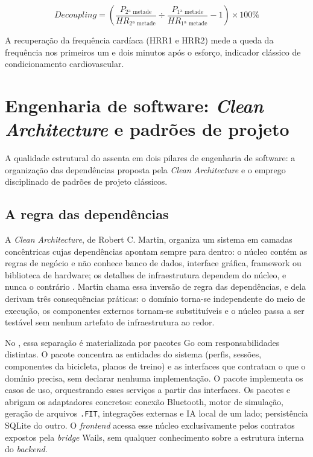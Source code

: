 \begin{equation}\label{eq:decoupling}
Decoupling = \left( \frac{P_{\text{2ª metade}}}{HR_{\text{2ª metade}}} \div \frac{P_{\text{1ª metade}}}{HR_{\text{1ª metade}}} - 1 \right) \times 100\%
\end{equation}

A recuperação da frequência cardíaca (HRR1 e HRR2) mede a queda da frequência
nos primeiros um e dois minutos após o esforço, indicador clássico de
condicionamento cardiovascular.

\section{Engenharia de software: \textit{Clean Architecture} e padrões de projeto}
\label{sec:engenharia}

A qualidade estrutural do \argus{} assenta em dois pilares de engenharia de
software: a organização das dependências proposta pela \textit{Clean
Architecture} e o emprego disciplinado de padrões de projeto clássicos.

\subsection{A regra das dependências}
\label{sec:clean-architecture}

A \textit{Clean Architecture}, de Robert C. Martin, organiza um sistema em
camadas concêntricas cujas dependências apontam sempre para dentro: o núcleo
contém as regras de negócio e não conhece banco de dados, interface gráfica,
framework ou biblioteca de hardware; os detalhes de infraestrutura dependem do
núcleo, e nunca o contrário \cite{martin2017clean}. Martin chama essa inversão
de regra das dependências, e dela derivam três consequências práticas: o
domínio torna-se independente do meio de execução, os componentes externos
tornam-se substituíveis e o núcleo passa a ser testável sem nenhum artefato
de infraestrutura ao redor.

No \argus{}, essa separação é materializada por pacotes Go com
responsabilidades distintas. O pacote  concentra as
entidades do sistema (perfis, sessões, componentes da bicicleta, planos de
treino) e as interfaces que contratam o que o domínio precisa, sem declarar
nenhuma implementação. O pacote  implementa os casos de
uso, orquestrando esses serviços a partir das interfaces. Os pacotes
 e  abrigam os adaptadores
concretos: conexão Bluetooth, motor de simulação, geração de arquivos
\texttt{.FIT}, integrações externas e IA local de um lado; persistência SQLite
do outro. O \textit{frontend} acessa esse núcleo exclusivamente pelos
contratos expostos pela \textit{bridge} Wails, sem qualquer conhecimento
sobre a estrutura interna do \textit{backend}.

